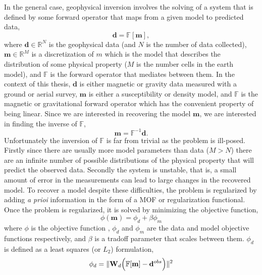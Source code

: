 In the general case, geophysical inversion involves the solving of a system that is defined by some forward operator that maps from a given model to predicted data,
\begin{equation}
\mathbf d = \mathbb F [\mathbf m],
\end{equation}
\label{eq:forwardProb}
where $\mathbf d \in \mathbb R^N$ is the geophysical data (and $N$ is the number of data collected),  $\mathbf m \in \mathbb R^M$ is a discretization of $m$ which is the model that describes the distribution of some physical property ($M$ is the number cells in the earth model), and $\mathbb F$ is the forward operator that mediates between them. In the context of this thesis, $\mathbf d$ is  either magnetic or gravity data measured with a ground or aerial survey, $\mathbf m$ is either a susceptibility or density model, and $\mathbb F$ is the magnetic or gravitational forward operator which has the convenient property of being linear. Since we are interested in recovering the model $\mathbf m$, we are interested in finding the inverse of $\mathbb F$,
\begin{equation}
\mathbf m= \mathbb F^{-1}\mathbf d.
\end{equation}
\label{eq:inverseProb}
Unfortunately the inversion of $\mathbb F$ is far from trivial as the problem is ill-posed. Firstly since there are usually more model parameters than data ($M > N$) there are an infinite number of possible distributions of the physical property that will predict the observed data. Secondly the system is unstable, that is, a small amount of error in the measurements can lead to large changes in the recovered model. To recover a model despite these difficulties, the problem is regularized by adding \emph{a prioi} information in the form of a \ac{MOF} or regularization functional. Once the problem is regularized, it is solved by minimizing the objective function,
\begin{equation}
\phi(\mathbf m) = \phi_d + \beta \phi_m
\end{equation}
\label{eq:objectiveFunc}
where $\phi$ is the objective function , $\phi_d$ and $\phi_m$ are the data and model objective functions respectively, and $\beta$ is a tradoff parameter that scales between them. $\phi_d$ is defined as a least squares (or $L_2$) formulation,
\begin{equation}
\phi_d =\|\mathbf W_d\Big(\mathbb F [\mathbf m] - \mathbf d^{obs}\Big)\|^2\\
\end{equation}
\label{eq:phid}
